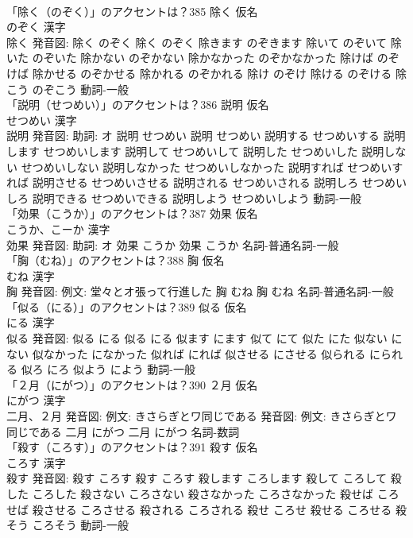 \documentclass[8pt]{extreport}
\begin{document}
\begin{CJK}{UTF8}{min}
\\	「除く（のぞく）」のアクセントは？385	除く 仮名　
\\	のぞく 漢字　
\\	除く 発音図:	除く のぞく		除く のぞく 除きます のぞきます 除いて のぞいて 除いた のぞいた 除かない のぞかない 除かなかった のぞかなかった 除けば のぞけば 除かせる のぞかせる 除かれる のぞかれる 除け のぞけ 除ける のぞける 除こう のぞこう				動詞-一般 
\\	「説明（せつめい）」のアクセントは？386	説明 仮名　
\\	せつめい 漢字　
\\	説明 発音図: 助詞: オ	説明 せつめい		説明 せつめい 説明する せつめいする 説明します せつめいします 説明して せつめいして 説明した せつめいした 説明しない せつめいしない 説明しなかった せつめいしなかった 説明すれば せつめいすれば 説明させる せつめいさせる 説明される せつめいされる 説明しろ せつめいしろ 説明できる せつめいできる 説明しよう せつめいしよう				動詞-一般 
\\	「効果（こうか）」のアクセントは？387	効果 仮名　
\\	こうか、こーか 漢字　
\\	効果 発音図: 助詞: オ	効果 こうか		効果 こうか				名詞-普通名詞-一般 
\\	「胸（むね）」のアクセントは？388	胸 仮名　
\\	むね 漢字　
\\	胸 発音図: 例文: 堂々とオ張って行進した	胸 むね		胸 むね				名詞-普通名詞-一般 
\\	「似る（にる）」のアクセントは？389	似る 仮名　
\\	にる 漢字　
\\	似る 発音図:	似る にる		似る にる 似ます にます 似て にて 似た にた 似ない にない 似なかった になかった 似れば にれば 似させる にさせる 似られる にられる 似ろ にろ 似よう によう				動詞-一般 
\\	「２月（にがつ）」のアクセントは？390	２月 仮名　
\\	にがつ 漢字　
\\	二月、２月 発音図: 例文: きさらぎとワ同じである 発音図: 例文: きさらぎとワ同じである	二月 にがつ		二月 にがつ				名詞-数詞 
\\	「殺す（ころす）」のアクセントは？391	殺す 仮名　
\\	ころす 漢字　
\\	殺す 発音図:	殺す ころす		殺す ころす 殺します ころします 殺して ころして 殺した ころした 殺さない ころさない 殺さなかった ころさなかった 殺せば ころせば 殺させる ころさせる 殺される ころされる 殺せ ころせ 殺せる ころせる 殺そう ころそう				動詞-一般 

\end{CJK}
\end{document}
